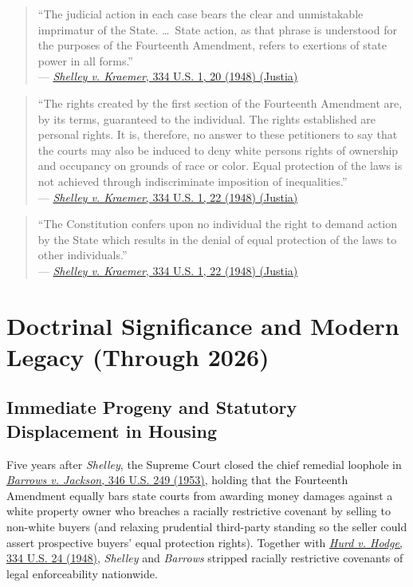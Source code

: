 \documentclass[12pt]{article}
\begin{document}
\begin{quote}
``The judicial action in each case bears the clear and unmistakable imprimatur of the State. \ldots\ State action, as that phrase is understood for the purposes of the Fourteenth Amendment, refers to exertions of state power in all forms.'' \\
--- \href{https://supreme.justia.com/cases/federal/us/334/1/}{\textit{Shelley v. Kraemer}, 334 U.S. 1, 20 (1948) (Justia)}
\end{quote}

\begin{quote}
``The rights created by the first section of the Fourteenth Amendment are, by its terms, guaranteed to the individual. The rights established are personal rights. It is, therefore, no answer to these petitioners to say that the courts may also be induced to deny white persons rights of ownership and occupancy on grounds of race or color. Equal protection of the laws is not achieved through indiscriminate imposition of inequalities.'' \\
--- \href{https://supreme.justia.com/cases/federal/us/334/1/}{\textit{Shelley v. Kraemer}, 334 U.S. 1, 22 (1948) (Justia)}
\end{quote}

\begin{quote}
``The Constitution confers upon no individual the right to demand action by the State which results in the denial of equal protection of the laws to other individuals.'' \\
--- \href{https://supreme.justia.com/cases/federal/us/334/1/}{\textit{Shelley v. Kraemer}, 334 U.S. 1, 22 (1948) (Justia)}
\end{quote}

\section{Doctrinal Significance and Modern Legacy (Through 2026)}

\subsection{Immediate Progeny and Statutory Displacement in Housing}
Five years after \textit{Shelley}, the Supreme Court closed the chief remedial loophole in \href{https://supreme.justia.com/cases/federal/us/346/249/}{\textit{Barrows v. Jackson}, 346 U.S. 249 (1953)}, holding that the Fourteenth Amendment equally bars state courts from awarding money damages against a white property owner who breaches a racially restrictive covenant by selling to non-white buyers (and relaxing prudential third-party standing so the seller could assert prospective buyers' equal protection rights). Together with \href{https://supreme.justia.com/cases/federal/us/334/24/}{\textit{Hurd v. Hodge}, 334 U.S. 24 (1948)}, \textit{Shelley} and \textit{Barrows} stripped racially restrictive covenants of legal enforceability nationwide.
\end{document}
